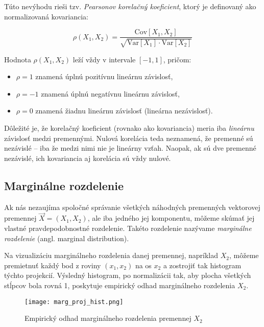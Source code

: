 Túto nevýhodu rieši tzv. \textit{Pearsonov korelačný koeficient}, ktorý je definovaný ako normalizovaná kovariancia:

\begin{equation}
\rho(X_1, X_2) = \frac{\mathrm{Cov}[X_1, X_2]}{\sqrt{\mathrm{Var}[X_1] \cdot \mathrm{Var}[X_2]}}
\end{equation}

Hodnota $\rho(X_1, X_2)$ leží vždy v intervale $[-1, 1]$, pričom:

\begin{itemize}
  \item $\rho = 1$ znamená úplnú pozitívnu lineárnu závislosť,
  \item $\rho = -1$ znamená úplnú negatívnu lineárnu závislosť,
  \item $\rho = 0$ znamená žiadnu lineárnu závislosť (lineárna nezávislosť).
\end{itemize}

Dôležité je, že korelačný koeficient (rovnako ako kovariancia) meria iba \textit{lineárnu} závislosť medzi premennými. Nulová korelácia teda neznamená, že premenné sú nezávislé – iba že medzi nimi nie je lineárny vzťah. Naopak, ak sú dve premenné nezávislé, ich kovariancia aj korelácia sú vždy nulové.

\subsection{Marginálne rozdelenie}\label{subsec:marginal_dist}

Ak nás nezaujíma spoločné správanie všetkých náhodných premenných vektorovej premennej $\vec{X} = (X_1, X_2)$, ale iba jedného jej komponentu, môžeme skúmať jej vlastné pravdepodobnostné rozdelenie. Takéto rozdelenie nazývame \textit{marginálne rozdelenie} (angl. marginal distribution).

Na vizualizáciu marginálneho rozdelenia danej premennej, napríklad $X_2$, môžeme premietnuť každý bod z roviny $(x_1, x_2)$ na os $x_2$ a zostrojiť tak histogram týchto projekcií. Výsledný histogram, po normalizácii tak, aby plocha všetkých stĺpcov bola rovná 1, poskytuje empirický odhad marginálneho rozdelenia $X_2$.

\begin{figure}[H] 
    \centering 
    \texttt{[image: marg\_proj\_hist.png]} 
    \caption{Empirický odhad marginálneho rozdelenia premennej $X_2$} 
    \label{fig:margin_proj} 
\end{figure}

